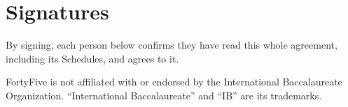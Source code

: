 \documentclass[11pt]{article}
\begin{document}

\clearpage
\section*{Signatures}

By signing, each person below confirms they have read this whole agreement, including its Schedules, and agrees to it.



\noindent{}

\vspace{1.2em}
{\footnotesize FortyFive is not affiliated with or endorsed by the International Baccalaureate Organization. ``International Baccalaureate'' and ``IB'' are its trademarks.\par}
\end{document}
